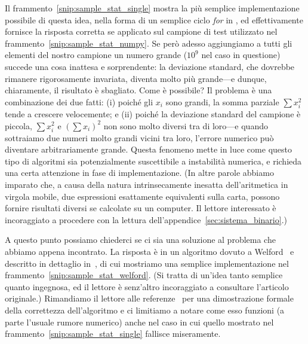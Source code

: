 
Il frammento~\ref{snip:sample_stat_single} mostra la più semplice implementazione
possibile di questa idea, nella forma di un semplice ciclo \emph{for} in \python,
ed effettivamente fornisce la risposta corretta se applicato sul campione
di test utilizzato nel frammento~\ref{snip:sample_stat_numpy}. Se però adesso
aggiungiamo a tutti gli elementi del nostro campione un numero grande ($10^9$
nel caso in questione) succede una cosa inattesa e sorprendente: la deviazione
standard, che dovrebbe rimanere rigorosamente invariata, diventa molto più
grande---e dunque, chiaramente, il risultato è sbagliato.
Come è possibile? Il problema è una combinazione dei due fatti: (i) poiché gli
$x_i$ sono grandi, la somma parziale $\sum x_i^2$ tende a crescere velocemente;
e (ii) poiché la deviazione standard del campione è piccola, $\sum x_i^2$ e $(\sum x_i)^2$
non sono molto diversi tra di loro---e quando sottraiamo due numeri molto grandi
vicini tra loro, l'errore numerico può diventare arbitrariamente grande.
Questa fenomeno mette in luce come questo tipo di algoritmi sia potenzialmente
suscettibile a instabilità numerica, e richieda una certa attenzione in fase di
implementazione. (In altre parole abbiamo imparato che, a causa della natura
intrinsecamente inesatta dell'aritmetica in virgola mobile, due espressioni
esattamente equivalenti sulla carta, possono fornire risultati diversi se calcolate
su un computer. Il lettore interessato è incoraggiato a procedere con la lettura dell'appendice~\ref{sec:sistema_binario}.)


A questo punto possiamo chiederci se ci sia una soluzione al problema che abbiamo
appena incontrato. La risposta è in un algoritmo dovuto a Welford~\cite{welford}
e descritto in dettaglio in~\cite{taocp2}, di cui mostriamo una semplice implementazione nel
frammento~\ref{snip:sample_stat_welford}. (Si tratta di un'idea tanto semplice
quanto ingegnosa, ed il lettore è senz'altro incoraggiato a consultare l'articolo
originale.)
Rimandiamo il lettore alle referenze~\cite{welford,taocp2} per una dimostrazione
formale della correttezza dell'algoritmo e ci limitiamo a notare come
esso funzioni (a parte l'usuale rumore numerico) anche nel caso in cui
quello mostrato nel frammento~\ref{snip:sample_stat_single} fallisce miseramente.



